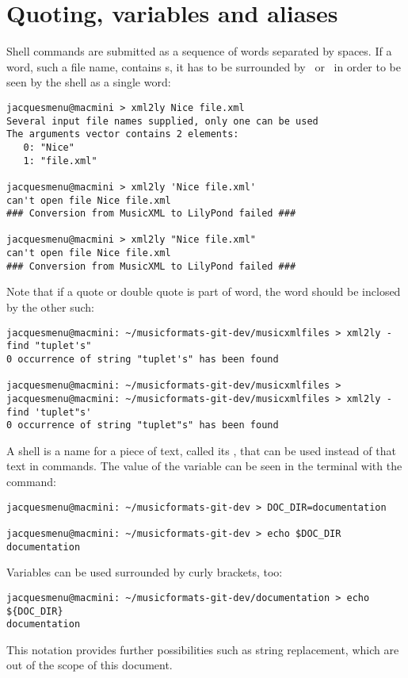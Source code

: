 \section{Quoting, variables and aliases}\label{Quoting, variables and aliases}

Shell commands are submitted as a sequence of words separated by spaces. If a word, such a file name, contains s, it has to be surrounded by \quotes\ or \doubleQuotes\ in order to be seen by the shell as a single word:
\begin{lstlisting}[language=Terminal]
jacquesmenu@macmini > xml2ly Nice file.xml
Several input file names supplied, only one can be used
The arguments vector contains 2 elements:
   0: "Nice"
   1: "file.xml"

jacquesmenu@macmini > xml2ly 'Nice file.xml'
can't open file Nice file.xml
### Conversion from MusicXML to LilyPond failed ###

jacquesmenu@macmini > xml2ly "Nice file.xml"
can't open file Nice file.xml
### Conversion from MusicXML to LilyPond failed ###
\end{lstlisting}

Note that if a quote or double quote is part of word, the word should be inclosed by the other such:
\begin{lstlisting}[language=Terminal]
jacquesmenu@macmini: ~/musicformats-git-dev/musicxmlfiles > xml2ly -find "tuplet's"
0 occurrence of string "tuplet's" has been found

jacquesmenu@macmini: ~/musicformats-git-dev/musicxmlfiles >
jacquesmenu@macmini: ~/musicformats-git-dev/musicxmlfiles > xml2ly -find 'tuplet"s'
0 occurrence of string "tuplet"s" has been found
\end{lstlisting}

A shell  is a name for a piece of text, called its , that can be used instead of that text in commands. The value of the variable can be seen in the terminal with the  command:
\begin{lstlisting}[language=Terminal]
jacquesmenu@macmini: ~/musicformats-git-dev > DOC_DIR=documentation

jacquesmenu@macmini: ~/musicformats-git-dev > echo $DOC_DIR
documentation
\end{lstlisting}

Variables can be used surrounded by curly brackets, too:
\begin{lstlisting}[language=Terminal]
jacquesmenu@macmini: ~/musicformats-git-dev/documentation > echo ${DOC_DIR}
documentation
\end{lstlisting}
This notation provides further possibilities such as string replacement, which are out of the scope of this document.


